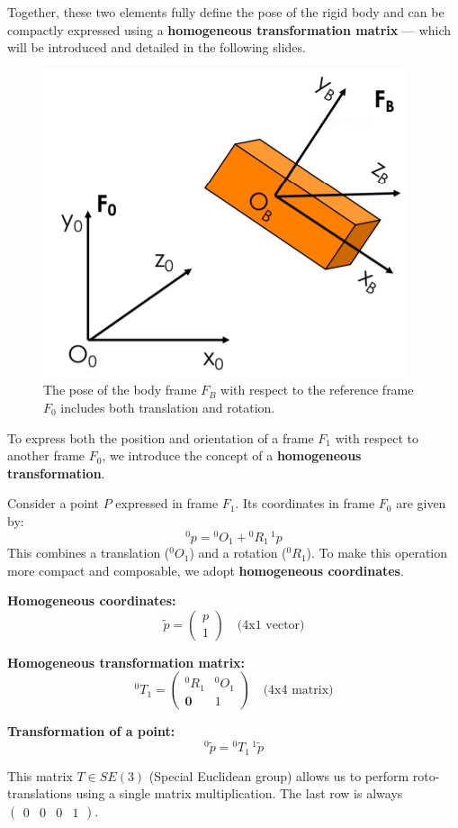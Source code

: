 Together, these two elements fully define the pose of the rigid body and can be compactly expressed using a \textbf{homogeneous transformation matrix} — which will be introduced and detailed in the following slides.

\begin{figure}[H]
  \centering
  \includegraphics[width=0.4\linewidth]{imgs/homogeneous_transformations.png}
  \caption{The pose of the body frame $F_B$ with respect to the reference frame $F_0$ includes both translation and rotation.}
\end{figure}

To express both the position and orientation of a frame $F_1$ with respect to another frame $F_0$, we introduce the concept of a \textbf{homogeneous transformation}.

Consider a point $P$ expressed in frame $F_1$. Its coordinates in frame $F_0$ are given by:
\[
{}^0\!p = {}^0\!O_1 + {}^0\!R_1\, {}^1\!p
\]
This combines a translation (${ }^0\!O_1$) and a rotation (${ }^0\!R_1$). To make this operation more compact and composable, we adopt \textbf{homogeneous coordinates}.

\textbf{Homogeneous coordinates:}
\[
\tilde{p} = 
\begin{pmatrix}
p \\
1
\end{pmatrix}
\quad \text{(4x1 vector)}
\]

\textbf{Homogeneous transformation matrix:}
\[
{}^0\!T_1 =
\begin{pmatrix}
{}^0\!R_1 & {}^0\!O_1 \\
\mathbf{0} & 1
\end{pmatrix}
\quad \text{(4x4 matrix)}
\]

\textbf{Transformation of a point:}
\[
{}^0\!\tilde{p} = {}^0\!T_1\, {}^1\!\tilde{p}
\]

This matrix $T \in SE(3)$ (Special Euclidean group) allows us to perform roto-translations using a single matrix multiplication. The last row is always $\begin{pmatrix} 0 & 0 & 0 & 1 \end{pmatrix}$.


